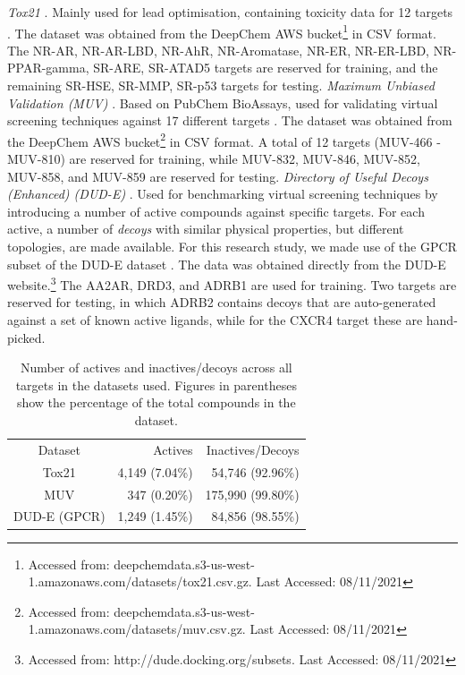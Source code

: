 \documentclass[journal=acscii,manuscript=article]{achemso}
\begin{document}
\textit{Tox21} \cite{huang2016tox21challenge}. Mainly used for lead optimisation, containing toxicity data for 12 targets \citep{tox21}. The dataset was obtained from the DeepChem AWS bucket\footnote{Accessed from: deepchemdata.s3-us-west-1.amazonaws.com/datasets/tox21.csv.gz. Last Accessed: 08/11/2021} in CSV format. The NR-AR, NR-AR-LBD, NR-AhR, NR-Aromatase, NR-ER, NR-ER-LBD, NR-PPAR-gamma, SR-ARE, SR-ATAD5 targets are reserved for training, and the remaining SR-HSE, SR-MMP, SR-p53 targets for testing.
\textit{Maximum Unbiased Validation (MUV)} \citep{rohrer2009maximum}. Based on PubChem BioAssays, used for validating virtual screening techniques against 17 different targets \citep{rohrer2009maximum}. The dataset was obtained from the DeepChem AWS bucket\footnote{Accessed from: deepchemdata.s3-us-west-1.amazonaws.com/datasets/muv.csv.gz. Last Accessed: 08/11/2021} in CSV format. A total of 12 targets (MUV-466 - MUV-810) are reserved for training, while MUV-832, MUV-846, MUV-852, MUV-858, and MUV-859 are reserved for testing.
\textit{Directory of Useful Decoys (Enhanced) (DUD-E)} \cite{mysinger2012directory}. Used for benchmarking virtual screening techniques by introducing a number of active compounds against specific targets. For each active, a number of \textit{decoys} with similar physical properties, but different topologies, are made available. For this research study, we made use of the GPCR subset of the DUD-E dataset \citep{mysinger2012directory}. The data was obtained directly from the DUD-E website.\footnote{Accessed from: http://dude.docking.org/subsets. Last Accessed: 08/11/2021} The AA2AR, DRD3, and ADRB1 are used for training. Two targets are reserved for testing, in which ADRB2 contains decoys that are auto-generated against a set of known active ligands, while for the CXCR4 target these are hand-picked. 

\begin{table}[h]
\centering
\caption{Number of actives and inactives/decoys across all targets in the datasets used. Figures in parentheses show the percentage of the total compounds in the dataset.}
\begin{tabular}{@{}crr@{}}
Dataset & Actives & Inactives/Decoys \\
Tox21 & 4,149 (7.04\%) & 54,746 (92.96\%) \\
MUV & 347 (0.20\%) & 175,990 (99.80\%) \\
DUD-E (GPCR) & 1,249 (1.45\%) & 84,856 (98.55\%) \\
\end{tabular}
\label{table:datasetimbalance}
\end{table}
\end{document}
